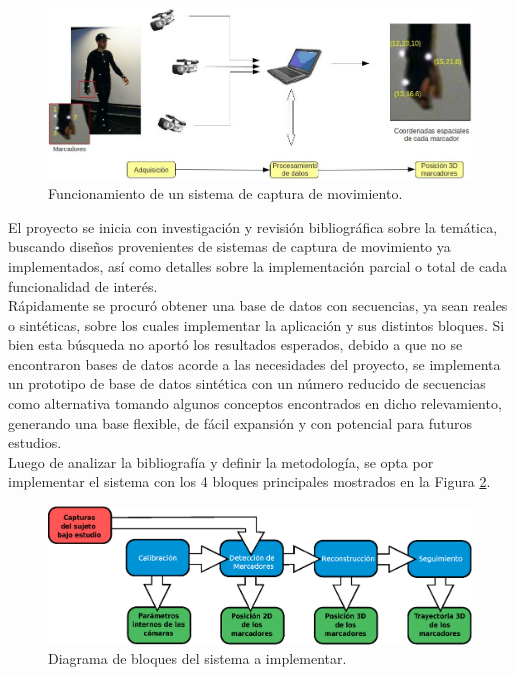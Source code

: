 \begin{figure}[ht!]
\begin{center}
\includegraphics[scale=0.4]{img/Sistema_completo/diagrama_abuelas_1.jpg}
\end{center}
\caption{Funcionamiento de un sistema de captura de movimiento.}
\label{abuela1}
\end{figure}


El proyecto se inicia con investigación y revisión bibliográfica sobre la temática, buscando diseños provenientes de sistemas de captura de movimiento ya implementados, así como  detalles sobre la implementación parcial o total de cada funcionalidad de interés. 
\\ 

Rápidamente se procuró obtener una base de datos con secuencias, ya sean reales o sintéticas, sobre los cuales implementar la aplicación y sus distintos bloques. Si bien esta búsqueda no aportó los resultados esperados,
 debido a que no se encontraron bases de datos acorde a las necesidades del proyecto, se implementa un prototipo de base de datos sintética con un número reducido de secuencias como alternativa tomando algunos conceptos encontrados en dicho relevamiento, generando una base flexible, de fácil expansión y con potencial para futuros estudios.\\ 

 Luego de analizar la bibliografía y definir la metodología, se opta por implementar el sistema con los 4 bloques principales mostrados en la Figura \ref{bloquesSistintro}. 

 \begin{figure}[H]
\begin{center}
\includegraphics[scale=0.7]{img/Sistema_completo/Diagrama_de_bloques.eps}
\end{center}
\caption{Diagrama de bloques del sistema a implementar.}
\label{bloquesSistintro}
\end{figure}

